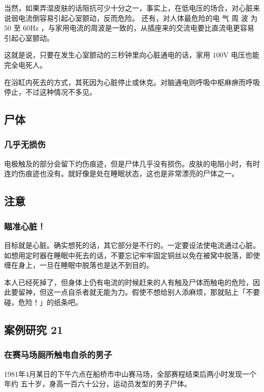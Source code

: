 \documentclass[UTF8]{ctexart}
\begin{document}
当然，如果弄湿皮肤的话阻抗可少十分之一，事实上，在低电压的场合，对心脏来说弱电流倒容易引起心室颤动，反而危险。
还有，对人体最危险的电 气 周 波 为 $50$ 至 $60\si{\hertz}$ ，与家用电流的周波是一致的，从插座来的交流电要比直流电更容易引起心室颤动。

这就是说，只要在发生心室颤动的三秒钟里向心脏通电的话，家用 $100\si{\volt}$ 电压也能完全电死人。

在浴缸内死去的方式，其死因为心脏停止或休克。对脑通电则呼吸中枢麻痹而呼吸停止，不过这种情况不多见。

\subsection{尸体}

\subsubsection*{几乎无损伤}

电极触及的部分会留下灼伤痕迹，但是尸体几乎没有损伤。皮肤的电阻小时，有时连灼伤痕迹也没有。就好像是处在睡眠状态，这也是非常漂亮的尸体之一。

\subsection{注意}

\subsubsection*{瞄准心脏！}

目标就是心脏。确实想死的话，其它部分是不行的。一定要设法使电流通过心脏。如想用定时器在睡眠中死去的话，不要忘记牢牢固定铜丝以免在被窝中脱落，即使缠在身上，一旦在睡眠中脱落也是达不到目的。

本人已经死掉了，但身体上仍有电流的时候赶来的人有触及尸体而触电的危险，因此要留神，但这一点自杀者就无能为力。假使不想给别人添麻烦，那就贴上「不要碰，危险！」的纸条吧。


\subsection{案例研究 21}

\subsubsection*{在赛马场厕所触电自杀的男子}

1981年4月某日的下午六点在船桥市中山赛马场，全部赛程结束后两小时发现一个年约
五十岁，身高一百六十公分，运动员发型的男子尸体。
\end{document}
